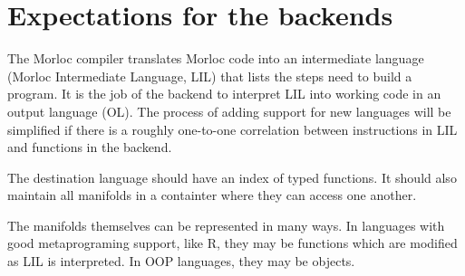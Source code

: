 \documentclass[12pt]{article}
\begin{document}
\section{Expectations for the backends}

The Morloc compiler translates Morloc code into an intermediate language
(Morloc Intermediate Language, LIL) that lists the steps need to build a
program. It is the job of the backend to interpret LIL into working code in an
output language (OL). The process of adding support for new languages will be
simplified if there is a roughly one-to-one correlation between instructions in
LIL and functions in the backend.

The destination language should have an index of typed functions. It should
also maintain all manifolds in a containter where they can access one another.

The manifolds themselves can be represented in many ways. In languages with
good metaprograming support, like R, they may be functions which are modified
as LIL is interpreted. In OOP languages, they may be objects.
\end{document}

